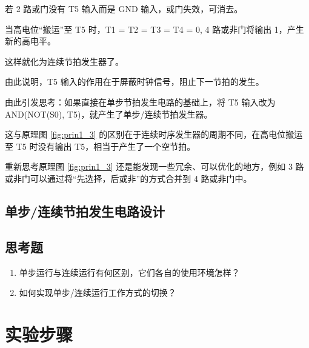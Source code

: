 若 2 路或门没有 T5 输入而是 GND 输入，或门失效，可消去。

当高电位“搬运”至 T5 时，T1 = T2 = T3 = T4 = 0, 4 路或非门将输出 1，产生新的高电平。

这样就化为连续节拍发生器了。

由此说明，T5 输入的作用在于屏蔽时钟信号，阻止下一节拍的发生。

由此引发思考：如果直接在单步节拍发生电路的基础上，将 T5 输入改为 AND(NOT(S0), T5)，就产生了单步/连续节拍发生器。

这与原理图 \ref{fig:prin1_3} 的区别在于连续时序发生器的周期不同，在高电位搬运至 T5 时没有输出 T5，相当于产生了一个空节拍。

重新思考原理图 \ref{fig:prin1_3} 还是能发现一些冗余、可以优化的地方，例如 3 路或非门可以通过将“先选择，后或非”的方式合并到 4 路或非门中。

\subsection{单步/连续节拍发生电路设计}

\subsection{思考题}

\begin{enumerate}
    \item 单步运行与连续运行有何区别，它们各自的使用环境怎样？
    
    \item 如何实现单步/连续运行工作方式的切换？
    
\end{enumerate}

\section{实验步骤}
